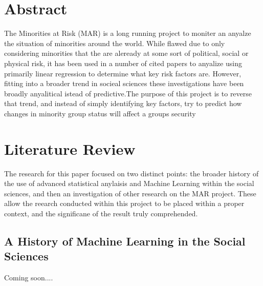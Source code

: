 \documentclass[12pt]{article}
\begin{document}

\newcommand{\hmwkClass}{CS 280}
\newcommand{\hmwkSemester}{Fall 2016}

\newcommand{\hmwkAuthorName}{Brendan Burgess}
\newcommand{\hmwkAuthorID}{brburgess}

\newcommand{\hmwkAssignmentNum}{4}

\newcommand{\hmwkProblemNum}{1}




\noindent

\section{Abstract}
The Minorities at Risk (MAR) is a long running project to moniter an anyalze the situation of minorities around the world. While flawed due to only considering minorities that the are aleready at some sort of political, social or physical risk, it has been used in a number of cited papers to anyalize using primarily linear regression to determine what key risk factors are. However, fitting into a broader trend in socieal sciences these investigations have been broadly anyalitical istead of predictive.The purpose of this project is to reverse that trend, and instead of simply identifying key factors, try to predict how changes in minority group status will affect a groups security

\section{Literature Review}

The research for this paper focused on two distinct points: the broader history of the use of advanced statistical anylaisis and Machine Learning within the social sciences, and then an investigation of other research on the MAR project. These allow the reearch conducted within this project to be placed within a proper context, and the significane of the result truly comprehended. 

\subsection{A History of Machine Learning in the Social Sciences}
Coming soon....
\end{document}
